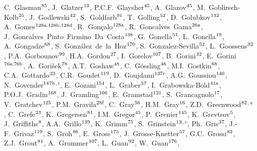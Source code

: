 \begin{flushleft}
C.~Glasman$^\textrm{\scriptsize 85}$,
J.~Glatzer$^\textrm{\scriptsize 13}$,
P.C.F.~Glaysher$^\textrm{\scriptsize 45}$,
A.~Glazov$^\textrm{\scriptsize 45}$,
M.~Goblirsch-Kolb$^\textrm{\scriptsize 25}$,
J.~Godlewski$^\textrm{\scriptsize 42}$,
S.~Goldfarb$^\textrm{\scriptsize 91}$,
T.~Golling$^\textrm{\scriptsize 52}$,
D.~Golubkov$^\textrm{\scriptsize 132}$,
A.~Gomes$^\textrm{\scriptsize 128a,128b,128d}$,
R.~Gon\c{c}alo$^\textrm{\scriptsize 128a}$,
R.~Goncalves~Gama$^\textrm{\scriptsize 26a}$,
J.~Goncalves~Pinto~Firmino~Da~Costa$^\textrm{\scriptsize 138}$,
G.~Gonella$^\textrm{\scriptsize 51}$,
L.~Gonella$^\textrm{\scriptsize 19}$,
A.~Gongadze$^\textrm{\scriptsize 68}$,
S.~Gonz\'alez~de~la~Hoz$^\textrm{\scriptsize 170}$,
S.~Gonzalez-Sevilla$^\textrm{\scriptsize 52}$,
L.~Goossens$^\textrm{\scriptsize 32}$,
P.A.~Gorbounov$^\textrm{\scriptsize 99}$,
H.A.~Gordon$^\textrm{\scriptsize 27}$,
I.~Gorelov$^\textrm{\scriptsize 107}$,
B.~Gorini$^\textrm{\scriptsize 32}$,
E.~Gorini$^\textrm{\scriptsize 76a,76b}$,
A.~Gori\v{s}ek$^\textrm{\scriptsize 78}$,
A.T.~Goshaw$^\textrm{\scriptsize 48}$,
C.~G\"ossling$^\textrm{\scriptsize 46}$,
M.I.~Gostkin$^\textrm{\scriptsize 68}$,
C.A.~Gottardo$^\textrm{\scriptsize 23}$,
C.R.~Goudet$^\textrm{\scriptsize 119}$,
D.~Goujdami$^\textrm{\scriptsize 137c}$,
A.G.~Goussiou$^\textrm{\scriptsize 140}$,
N.~Govender$^\textrm{\scriptsize 147b}$$^{,t}$,
E.~Gozani$^\textrm{\scriptsize 154}$,
L.~Graber$^\textrm{\scriptsize 57}$,
I.~Grabowska-Bold$^\textrm{\scriptsize 41a}$,
P.O.J.~Gradin$^\textrm{\scriptsize 168}$,
J.~Gramling$^\textrm{\scriptsize 166}$,
E.~Gramstad$^\textrm{\scriptsize 121}$,
S.~Grancagnolo$^\textrm{\scriptsize 17}$,
V.~Gratchev$^\textrm{\scriptsize 125}$,
P.M.~Gravila$^\textrm{\scriptsize 28f}$,
C.~Gray$^\textrm{\scriptsize 56}$,
H.M.~Gray$^\textrm{\scriptsize 16}$,
Z.D.~Greenwood$^\textrm{\scriptsize 82}$$^{,u}$,
C.~Grefe$^\textrm{\scriptsize 23}$,
K.~Gregersen$^\textrm{\scriptsize 81}$,
I.M.~Gregor$^\textrm{\scriptsize 45}$,
P.~Grenier$^\textrm{\scriptsize 145}$,
K.~Grevtsov$^\textrm{\scriptsize 5}$,
J.~Griffiths$^\textrm{\scriptsize 8}$,
A.A.~Grillo$^\textrm{\scriptsize 139}$,
K.~Grimm$^\textrm{\scriptsize 75}$,
S.~Grinstein$^\textrm{\scriptsize 13}$$^{,v}$,
Ph.~Gris$^\textrm{\scriptsize 37}$,
J.-F.~Grivaz$^\textrm{\scriptsize 119}$,
S.~Groh$^\textrm{\scriptsize 86}$,
E.~Gross$^\textrm{\scriptsize 175}$,
J.~Grosse-Knetter$^\textrm{\scriptsize 57}$,
G.C.~Grossi$^\textrm{\scriptsize 82}$,
Z.J.~Grout$^\textrm{\scriptsize 81}$,
A.~Grummer$^\textrm{\scriptsize 107}$,
L.~Guan$^\textrm{\scriptsize 92}$,
W.~Guan$^\textrm{\scriptsize 176}$,
$$
\end{flushleft}
